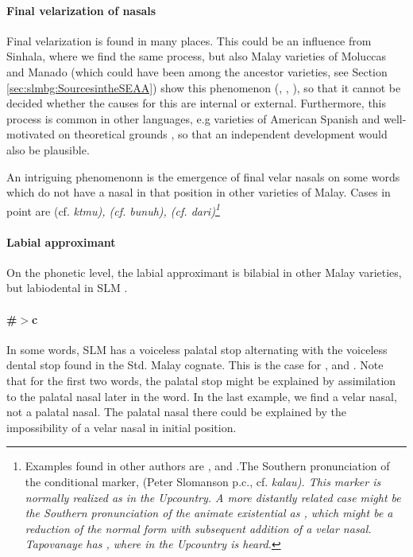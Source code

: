 \paragraph{Final velarization of nasals}\label{sec:phon:Finalvelarizationofnasals}
Final velarization is found in many places. This could be an influence from Sinhala, where we find the same process, but also Malay varieties of Moluccas and Manado (which could have been among the ancestor varieties, see Section \ref{sec:slmbg:SourcesintheSEAA}) show this phenomenon (\citet[27]{Adelaar1991}, \citet[]{Paauw2004}, \citet{SmithEtAl2004}), so that it cannot be decided whether the causes for this are internal or external. Furthermore, this process is common in other languages, e.g varieties of American Spanish
\citep[10f]{Hualde2005} and well-motivated on theoretical grounds \citep[322ff]{Botma2004}, so that an independent development would also be plausible.

An intriguing phenomenonn is the emergence of final velar nasals on some words which do not have a nasal in that position in other varieties of Malay. Cases in point are
 (cf. \em k\E t\E mu\em),
 (cf. \em bunuh\em),
 (cf. \em dari\em)\footnote{Examples found in other authors are ,  and  .The Southern pronunciation of the conditional marker,  (Peter Slomanson p.c., cf. \em kalau\em).
This marker is normally realized as  in the Upcountry.  A more distantly related case might be the Southern pronunciation of the animate existential as  \citep{Slomanson2008ismil}, which might be a reduction of the normal form  with subsequent addition of a velar nasal. Tapovanaye has , where in the Upcountry  is heard.}
\paragraph{Labial approximant}
On the phonetic level, the labial approximant is bilabial in other Malay varieties, but labiodental in SLM \citep{Bichsel, SmithEtAl2004}.

\paragraph{\#\dentt$>$c}
In some words, SLM has a voiceless palatal stop alternating with the voiceless dental stop found in the Std. Malay cognate. This is the case for ,  and . Note that for the first two words, the palatal stop might be explained by assimilation to the  palatal nasal later in the word. In the last example, we find a velar nasal, not a palatal nasal. The palatal nasal there could be explained by the impossibility of a velar nasal in initial position.

